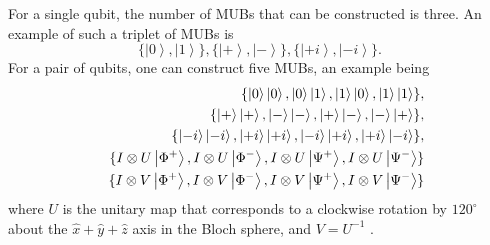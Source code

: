 \documentclass[pra,twocolumn,nofootinbib,showpacs]{revtex4}
\begin{document}
For a single qubit, the number of MUBs that can be constructed is three. An
example of such a triplet of MUBs is
\begin{equation}
\{\left| 0\right\rangle ,\left| 1\right\rangle \},\{\left| +\right\rangle
,\left| -\right\rangle \},\{\left| +i\right\rangle ,\left| -i\right\rangle
\}.
\end{equation}
For a pair of qubits, one can construct five MUBs, an example being
\begin{eqnarray}
&&\{\left| 0\right\rangle \left| 0\right\rangle ,\left| 0\right\rangle
\left| 1\right\rangle ,\left| 1\right\rangle \left| 0\right\rangle ,\left|
1\right\rangle \left| 1\right\rangle \},  \notag \\
&&\{\left| +\right\rangle \left| +\right\rangle ,\left| -\right\rangle
\left| -\right\rangle ,\left| +\right\rangle \left| -\right\rangle ,\left|
-\right\rangle \left| +\right\rangle \},  \notag \\
&&\{\left| -i\right\rangle \left| -i\right\rangle ,\left| +i\right\rangle
\left| +i\right\rangle ,\left| -i\right\rangle \left| +i\right\rangle
,\left| +i\right\rangle \left| -i\right\rangle \},  \notag \\
&&\{I\otimes U\left| \Phi ^{+}\right\rangle ,I\otimes U\left| \Phi
^{-}\right\rangle ,I\otimes U\left| \Psi ^{+}\right\rangle ,I\otimes U\left|
\Psi ^{-}\right\rangle \}  \notag \\
&&\{I\otimes V\left| \Phi ^{+}\right\rangle ,I\otimes V\left| \Phi
^{-}\right\rangle ,I\otimes V\left| \Psi ^{+}\right\rangle ,I\otimes V\left|
\Psi ^{-}\right\rangle \}  \notag \\
\end{eqnarray}
where $U$ is the unitary map that corresponds to a clockwise rotation by $%
120^{\circ }$ about the $\hat{x}+\hat{y}+\hat{z}$ axis in the Bloch sphere,
and $V=U^{-1}$ \cite{WoottersWignerfunctions}.
\end{document}
